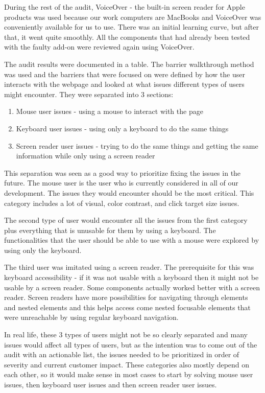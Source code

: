 \documentclass{master_thesis}
\begin{document}
During the rest of the audit, VoiceOver - the built-in screen reader for Apple products was used because our work computers are MacBooks and VoiceOver was conveniently available for us to use. There was an initial learning curve, but after that, it went quite smoothly. All the components that had already been tested with the faulty add-on were reviewed again using VoiceOver.

The audit results were documented in a table. The barrier walkthrough method was used and the barriers that were focused on were defined by how the user interacts with the webpage and looked at what issues different types of users might encounter. They were separated into 3 sections:
\begin{enumerate}
	\item Mouse user issues - using a mouse to interact with the page
	\item Keyboard user issues - using only a keyboard to do the same things
	\item Screen reader user issues - trying to do the same things and getting the same information while only using a screen reader
\end{enumerate}

This separation was seen as a good way to prioritize fixing the issues in the future. The mouse user is the user who is currently considered in all of our development. The issues they would encounter should be the most critical. This category includes a lot of visual, color contrast, and click target size issues.

The second type of user would encounter all the issues from the first category plus everything that is unusable for them by using a keyboard. The functionalities that the user should be able to use with a mouse were explored by using only the keyboard.

The third user was imitated using a screen reader. The prerequisite for this was keyboard accessibility - if it was not usable with a keyboard then it might not be usable by a screen reader. Some components actually worked better with a screen reader. Screen readers have more possibilities for navigating through elements and nested elements and this helps access come nested focusable elements that were unreachable by using regular keyboard navigation.

In real life, these 3 types of users might not be so clearly separated and many issues would affect all types of users, but as the intention was to come out of the audit with an actionable list, the issues needed to be prioritized in order of severity and current customer impact. These categories also mostly depend on each other, so it would make sense in most cases to start by solving mouse user issues, then keyboard user issues and then screen reader user issues.
\end{document}
